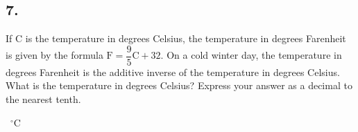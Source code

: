 \documentclass[12pt]{article}
\begin{document}
\begin{answer}
%
\end{answer}


\subsection*{7.}
If C is the temperature in degrees Celsius, the temperature in degrees Farenheit is given by the formula $\text{F}=\dfrac{9}{5}\text{C}+32$. On a cold winter day, the temperature in degrees Farenheit is the additive inverse of the temperature in degrees Celsius. What is the temperature in degrees Celsius? Express your answer as a decimal to the nearest tenth. 

\nopagebreak

\fbox{\phantom{ANSWER}}~$^{\circ}$C
\end{document}
